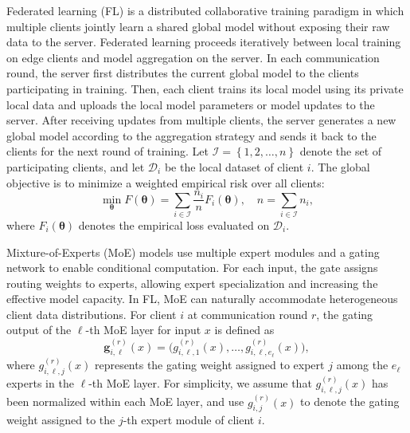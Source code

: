 \documentclass[conference]{IEEEtran}
\begin{document}
Federated learning (FL) is a distributed collaborative training paradigm in which multiple clients jointly learn a shared global model without exposing their raw data to the server. Federated learning proceeds iteratively between local training on edge clients and model aggregation on the server. In each communication round, the server first distributes the current global model to the clients participating in training. Then, each client trains its local model using its private local data and uploads the local model parameters or model updates to the server. After receiving updates from multiple clients, the server generates a new global model according to the aggregation strategy and sends it back to the clients for the next round of training. Let $\mathcal{I}=\left \{ 1,2,\dots ,n \right \} $ denote the set of participating clients, and let $\mathcal{D}_i$ be the local dataset of client $i$. The global objective is to minimize a weighted empirical risk over all clients:
\begin{equation}
\min_{\boldsymbol{\theta}} F(\boldsymbol{\theta})
=
\sum_{i\in\mathcal{I}}
\frac{n_i}{n}
F_i(\boldsymbol{\theta}),
\quad
n=\sum_{i\in\mathcal{I}} n_i ,
\end{equation}
where $F_i(\boldsymbol{\theta})$ denotes the empirical loss evaluated on $\mathcal{D}_i$. 

Mixture-of-Experts (MoE) models use multiple expert modules and a gating network to enable conditional computation. For each input, the gate assigns routing weights to experts, allowing expert specialization and increasing the effective model capacity. In FL, MoE can naturally accommodate heterogeneous client data distributions. For client $i$ at communication round $r$, the gating output of the $\ell$-th MoE layer for input $x$ is defined as
\begin{equation}
\mathbf{g}_{i,\ell}^{(r)}(x)
=
\bigl(
g_{i,\ell,1}^{(r)}(x),
\ldots,
g_{i,\ell,e_\ell}^{(r)}(x)
\bigr),
\end{equation}
where $g_{i,\ell,j}^{(r)}(x)$ represents the gating weight assigned to expert $j$ among the $e_\ell$ experts in the $\ell$-th MoE layer. For simplicity, we assume that $g_{i,\ell,j}^{(r)}(x)$ has been normalized within each MoE layer, and use $g_{i,j}^{(r)}(x)$ to denote the gating weight assigned to the $j$-th expert module of client $i$.
\end{document}
